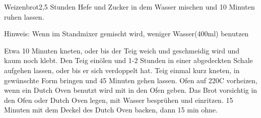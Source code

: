 \begin{recipe}{Weizenbrot}{}{2,5 Stunden}
Hefe und Zucker in dem Wasser mischen und 10 Minuten ruhen lassen.

Hinweis: Wenn im Standmixer gemischt wird, weniger Wasser(400ml) benutzen

Etwa 10 Minuten kneten, oder bis der Teig weich und geschmeidig wird und kaum noch klebt.
Den Teig einölen und 1-2 Stunden in einer abgedeckten Schale aufgehen lassen, oder bis er sich verdoppelt hat.
Teig einmal kurz kneten, in gewünschte Form bringen und 45 Minuten gehen lassen.
Ofen auf 220\0C vorheizen, wenn ein Dutch Oven benutzt wird mit in den Ofen geben.
Das Brot vorsichtig in den Ofen oder Dutch Oven legen, mit Wasser besprühen und einritzen.
15 Minuten mit dem Deckel des Dutch Oven backen, dann 15 min ohne.
\end{recipe}

